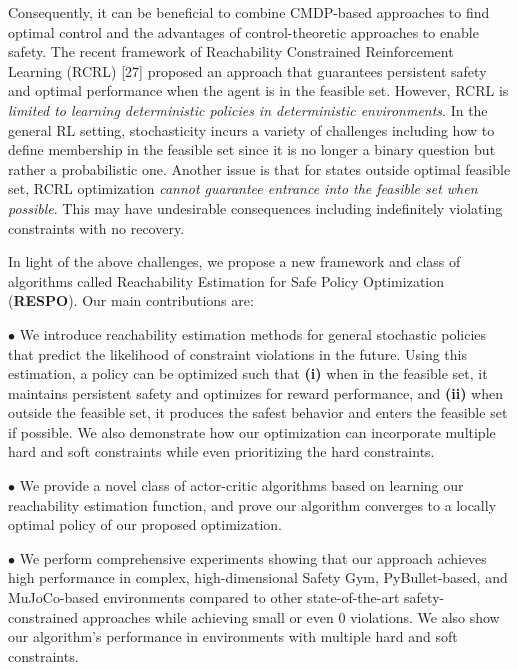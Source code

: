 \documentclass{article}
\theoremstyle{definition}
\begin{document}
Consequently, it can be beneficial to combine CMDP-based approaches to find optimal control and the advantages of control-theoretic approaches to enable safety. The recent framework of Reachability Constrained Reinforcement Learning (RCRL) [27] proposed an approach that guarantees persistent safety and optimal performance when the agent is in the feasible set. However, RCRL is \emph{limited to learning deterministic policies in deterministic environments}. 
In the general RL setting, stochasticity incurs a variety of challenges including how to define membership in the feasible set since it is no longer a binary question but rather a probabilistic one. 
Another issue is that for states outside optimal feasible set, RCRL optimization \emph{cannot guarantee entrance into the feasible set when possible}. This may have undesirable consequences including indefinitely violating constraints with no recovery.  

In light of the above challenges, we propose a new framework and class of algorithms called Reachability Estimation for Safe Policy Optimization (\textbf{RESPO}). Our main contributions are:

$\bullet$\hspace{0.3cm} We introduce reachability estimation methods for general stochastic policies that predict the likelihood of constraint violations in the future. Using this estimation, a policy can be optimized such that \textbf{(i)} when in the feasible set, it maintains persistent safety and optimizes for reward performance, and \textbf{(ii)} when outside the feasible set, it produces the safest behavior and enters the feasible set if possible. We also demonstrate how our optimization can incorporate multiple hard and soft constraints while even prioritizing the hard constraints.

$\bullet$\hspace{0.3cm} We provide a novel class of actor-critic algorithms based on learning our reachability estimation function, and prove our algorithm converges to a locally optimal policy of our proposed optimization.

$\bullet$\hspace{0.3cm} We perform comprehensive experiments showing that our approach achieves high performance in complex, high-dimensional Safety Gym, PyBullet-based, and MuJoCo-based environments compared to other state-of-the-art safety-constrained approaches while achieving small or even $0$ violations. We also show our algorithm's performance in environments with multiple hard and soft constraints. 
\end{document}
